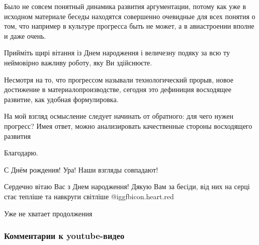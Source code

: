 \begin{itemize}
Было не совсем понятный динамика развития аргументации, потому как уже в
исходном материале беседы находятся совершенно очевидные для всех понятия о
том, что например в культуре прогресса быть не может, а в авиастроении вполне и
даже очень.


Прийміть щирі вітання із Днем народження і величезну подяку за всю ту
неймовірно важливу роботу, яку Ви здійснюєте.


Несмотря на то, что прогрессом называли технологический прорыв, новое
достижение в материалопроизводстве, сегодня это дефиниция восходящее развитие,
как удобная формулировка.

На мой взгляд осмысление следует начинать от обратного: для чего нужен
прогресс? Имея ответ, можно анализировать качественные стороны восходящего
развития

Благодарю.

С Днём рождения! Ура! Наши взгляды совпадают!

Сердечно вітаю Вас з Днем народження! Дякую Вам за бесіди, від них на серці стає тепліше та навкруги світліше 
@igg{fbicon.heart.red}

Уже не хватает продолжения

\end{itemize} %

\subsubsection{Комментарии к youtube-видео}
\label{sec:31_01_2022.fb.baumejster_andrej.kiev.filosof.1.progress.cmt}

